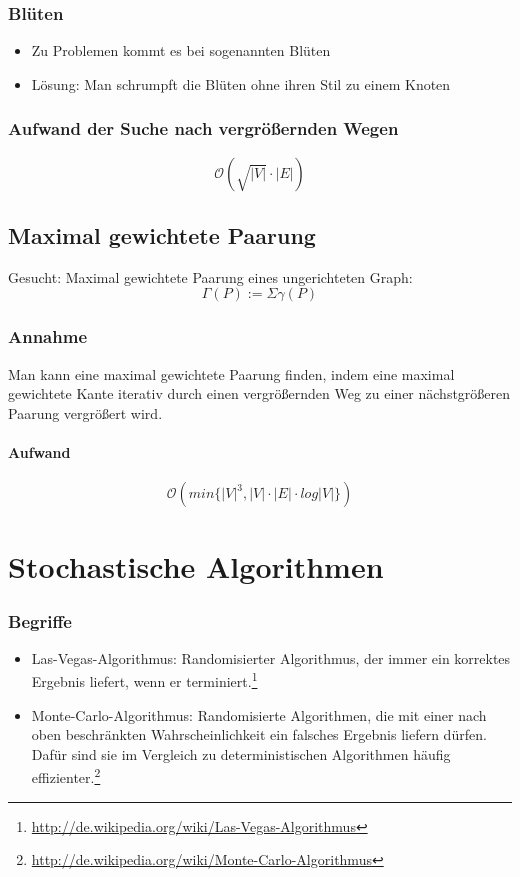 \subsubsection{Blüten}
\begin{itemize}
	\item Zu Problemen kommt es bei sogenannten Blüten
	\item Lösung: Man schrumpft die Blüten ohne ihren Stil zu einem Knoten
\end{itemize}

\subsubsection{Aufwand der Suche nach vergrößernden Wegen}
\[\mathcal{O}(\sqrt{|V|} \cdot |E|)\]


\subsection{Maximal gewichtete Paarung}
Gesucht: Maximal gewichtete Paarung eines ungerichteten Graph:
\[\Gamma(P) := \Sigma \gamma (P)\]

\subsubsection{Annahme}
Man kann eine maximal gewichtete Paarung finden, indem eine maximal gewichtete Kante iterativ durch einen vergrößernden Weg zu einer nächstgrößeren Paarung vergrößert wird.

\paragraph{Aufwand}
\[\mathcal{O}(min\{|V|^3, |V| \cdot |E| \cdot log|V|\})\]



\section{Stochastische Algorithmen}

\subsubsection{Begriffe}
\begin{itemize}
	\item Las-Vegas-Algorithmus: Randomisierter Algorithmus, der immer ein korrektes Ergebnis liefert, wenn er terminiert.\footnote{\url{http://de.wikipedia.org/wiki/Las-Vegas-Algorithmus}}
	\item Monte-Carlo-Algorithmus: Randomisierte Algorithmen, die mit einer nach oben beschränkten Wahrscheinlichkeit ein falsches Ergebnis liefern dürfen. Dafür sind sie im Vergleich zu deterministischen Algorithmen häufig effizienter.\footnote{\url{http://de.wikipedia.org/wiki/Monte-Carlo-Algorithmus}}
\end{itemize}

